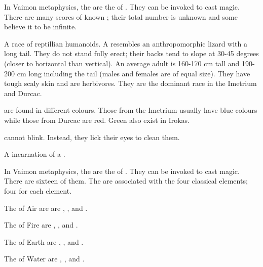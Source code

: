 \gitempl{\Qliphah}{\Qliphoth}
In Vaimon metaphysics, the \Qliphoth{} are the \Archons{} of \nieur{}. They can be invoked to cast magic. There are many scores of known \Qliphoth; their total number is unknown and some believe it to be infinite. 



\gitempl{\scatha{}}{\scathae{}}
A race of reptillian humanoids. A \scatha{} resembles an anthropomorphic lizard with a long tail. They do not stand fully erect; their backs tend to slope at 30-45 degrees (closer to horizontal than vertical). An average adult is 160-170 cm tall and 190-200 cm long including the tail (males and females are of equal size). They have tough scaly skin and are herbivores. They are the dominant race in the Imetrium and Durcac. 

\Scathae{} are found in different colours. Those from the Imetrium usually have blue colours while those from Durcac are red. Green \scathae{} also exist in Irokas. 

\Scathae{} cannot blink. Instead, they lick their eyes to clean them. 




A \human{} incarnation of a \Malach{}. 



\gitempl{\Sephirah}{\Sephiroth}
In Vaimon metaphysics, the \Sephiroth{} are the \Archons{} of \iquin{}. They can be invoked to cast magic. There are sixteen of them. The \Sephiroth{} are associated with the four classical elements; four for each element. 

\index{\Atzirah}
\index{\Feazirah}
\index{\Keshirah}
\index{\Razilah}
The \Sephiroth{} of Air are are \Atzirah{}, \Feazirah{}, \Keshirah{} and \Razilah. 

\index{\Barion}
\index{\Hapheron}
\index{\Izion}
\index{\Teshiron}
The \Sephiroth{} of Fire are \Barion{}, \Hapheron{}, \Izion{} and \Teshiron{}. 

\index{\Cushed}
\index{\Hoshied}
\index{\Thimared}
\index{\Yemared}
The \Sephiroth{} of Earth are \Cushed{}, \Hoshied{}, \Thimared{} and \Yemared. 

\index{\Gamishiel}
\index{\Ishiel}
\index{\Omariel}
\index{\Yeziel}
The \Sephiroth{} of Water are \Gamishiel{}, \Ishiel{}, \Omariel{} and \Yeziel{}. 



